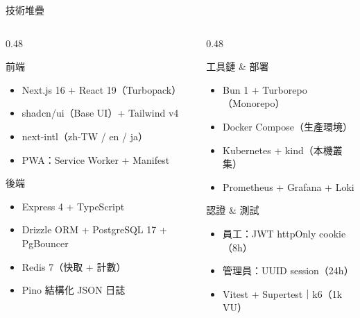 \documentclass[aspectratio=169,12pt]{beamer}
\begin{document}
\begin{frame}[shrink=18]{技術堆疊}
\begin{columns}[T,onlytextwidth]
\begin{column}{0.48\textwidth}
  \begin{block}{前端}
    \begin{itemize}\small
      \item Next.js 16 + React 19（Turbopack）
      \item shadcn/ui（Base UI）+ Tailwind v4
      \item next-intl（zh-TW / en / ja）
      \item PWA：Service Worker + Manifest
    \end{itemize}
  \end{block}
  \begin{block}{後端}
    \begin{itemize}\small
      \item Express 4 + TypeScript
      \item Drizzle ORM + PostgreSQL 17 + PgBouncer
      \item Redis 7（快取 + 計數）
      \item Pino 結構化 JSON 日誌
    \end{itemize}
  \end{block}
\end{column}
\begin{column}{0.48\textwidth}
  \begin{block}{工具鏈 \& 部署}
    \begin{itemize}\small
      \item Bun 1 + Turborepo（Monorepo）
      \item Docker Compose（生產環境）
      \item Kubernetes + kind（本機叢集）
      \item Prometheus + Grafana + Loki
    \end{itemize}
  \end{block}
  \begin{block}{認證 \& 測試}
    \begin{itemize}\small
      \item 員工：JWT httpOnly cookie（8h）
      \item 管理員：UUID session（24h）
      \item Vitest + Supertest｜k6（1k VU）
    \end{itemize}
  \end{block}
\end{column}
\end{columns}
\end{frame}
\end{document}
